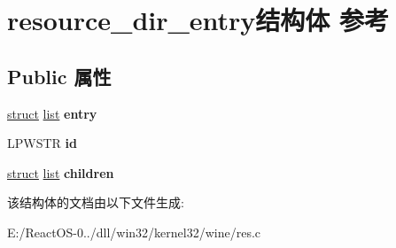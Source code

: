 \hypertarget{structresource__dir__entry}{}\section{resource\+\_\+dir\+\_\+entry结构体 参考}
\label{structresource__dir__entry}
\subsection*{Public 属性}
\begin{DoxyCompactItemize}
\item 
\mbox{\label{structresource__dir__entry_a4030c4dcc2509ecccaa73a09b6aa2a98}} 
\hyperlink{interfacestruct}{struct} \hyperlink{classlist}{list} {\bfseries entry}
\item 
\mbox{\label{structresource__dir__entry_afca45bc0e24b8bca468332381e17da5a}} 
L\+P\+W\+S\+TR {\bfseries id}
\item 
\mbox{\label{structresource__dir__entry_a2799f712a21f482517e48a41d6bde616}} 
\hyperlink{interfacestruct}{struct} \hyperlink{classlist}{list} {\bfseries children}
\end{DoxyCompactItemize}


该结构体的文档由以下文件生成\+:\begin{DoxyCompactItemize}
\item 
E\+:/\+React\+O\+S-\/0../dll/win32/kernel32/wine/res.\+c\end{DoxyCompactItemize}
